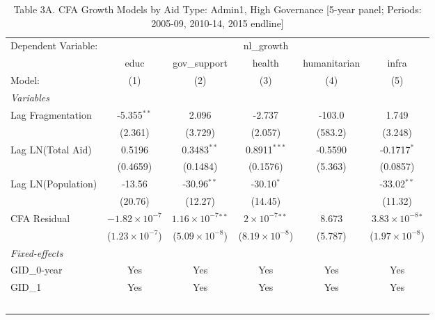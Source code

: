 
\begin{table}[H]
   \caption{Table 3A. CFA Growth Models by Aid Type: Admin1, High Governance [5-year panel; Periods: 2005-09, 2010-14, 2015 endline]}
   \centering
   \begin{tabular}{lccccc}
      \tabularnewline \midrule \midrule
      Dependent Variable: & \multicolumn{5}{c}{nl\_growth}\\
                         & educ                    & gov\_support                 & health                    & humanitarian & infra \\   
      Model:             & (1)                     & (2)                          & (3)                       & (4)          & (5)\\  
      \midrule
      \emph{Variables}\\
      Lag Fragmentation  & -5.355$^{**}$           & 2.096                        & -2.737                    & -103.0       & 1.749\\   
                         & (2.361)                 & (3.729)                      & (2.057)                   & (583.2)      & (3.248)\\   
      Lag LN(Total Aid)  & 0.5196                  & 0.3483$^{**}$                & 0.8911$^{***}$            & -0.5590      & -0.1717$^{*}$\\   
                         & (0.4659)                & (0.1484)                     & (0.1576)                  & (5.363)      & (0.0857)\\   
      Lag LN(Population) & -13.56                  & -30.96$^{**}$                & -30.10$^{*}$              &              & -33.02$^{**}$\\   
                         & (20.76)                 & (12.27)                      & (14.45)                   &              & (11.32)\\   
      CFA Residual       & $-1.82\times 10^{-7}$   & $1.16\times 10^{-7}$$^{**}$  & $2\times 10^{-7}$$^{**}$  & 8.673        & $3.83\times 10^{-8}$$^{*}$\\    
                         & ($1.23\times 10^{-7}$)  & ($5.09\times 10^{-8}$)       & ($8.19\times 10^{-8}$)    & (5.787)      & ($1.97\times 10^{-8}$)\\    
      \midrule
      \emph{Fixed-effects}\\
      GID\_0-year        & Yes                     & Yes                          & Yes                       & Yes          & Yes\\  
      GID\_1             & Yes                     & Yes                          & Yes                       & Yes          & Yes\\  
$$
\end{tabular}
\end{table}
